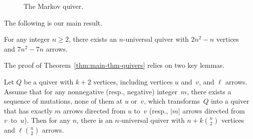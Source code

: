 \begin{figure}[ht]\centering
{}

\caption{The Markov quiver. }
\label{fig:Markov-quiver}
\end{figure}

The following is our main result. 

\begin{theorem}
\label{thm:main-thm-quivers}
For any integer $n\ge 2$, there exists an $n$-universal quiver with $2n^2-n$ vertices and $7n^2-7n$ arrows. 
\end{theorem}

The proof of Theorem~\ref{thm:main-thm-quivers} relies on two key lemmas.

\begin{lemma}
\label{lem:gluing}
Let $Q$ be a quiver with $k+2$ vertices, including vertices $u$ and~$v$, and $\ell$ arrows. Assume that for any nonnegative (resp., negative) integer~$m$, there exists a sequence of mutations, none of them at $u$ or~$v$, which transforms~$Q$ into a quiver that has exactly $m$ arrows directed from $u$ to~$v$ (resp., $|m|$ arrows directed from~$v$~to~$u$). %
Then for any $n$, there is an $n$-universal quiver with $n+k\binom{n}{2}$ vertices and $\ell\binom{n}{2}$ arrows. 
\end{lemma}

